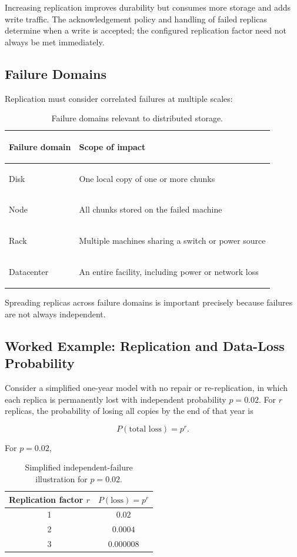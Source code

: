 \documentclass[11pt,a4paper,oneside]{book}
\begin{document}
Increasing replication improves durability but consumes more storage and adds write traffic. The acknowledgement policy and handling of failed replicas determine when a write is accepted; the configured replication factor need not always be met immediately.

\subsection{Failure Domains}

Replication must consider correlated failures at multiple scales:

\begin{table}[htbp]
\centering
\caption{Failure domains relevant to distributed storage.}
\label{tab:failure-domains}
\begin{tabularx}{0.78\textwidth}{>{\bfseries\raggedright\arraybackslash}p{3.1cm} Y}
\toprule
Failure domain & Scope of impact \\
\midrule
Disk & One local copy of one or more chunks \\
Node & All chunks stored on the failed machine \\
Rack & Multiple machines sharing a switch or power source \\
Datacenter & An entire facility, including power or network loss \\
\bottomrule
\end{tabularx}
\end{table}

Spreading replicas across failure domains is important precisely because failures are not always independent.

\subsection{Worked Example: Replication and Data-Loss Probability}

Consider a simplified one-year model with no repair or re-replication, in which each replica is permanently lost with independent probability \(p=0.02\). For \(r\) replicas, the probability of losing all copies by the end of that year is

\begin{equation}
P(\text{total loss}) = p^r.
\label{eq:replica-loss}
\end{equation}

For \(p=0.02\),

\begin{table}[htbp]
\centering
\caption{Simplified independent-failure illustration for \(p=0.02\).}
\label{tab:replica-prob}
\begin{tabular}{cc}
\toprule
Replication factor \(r\) & \(P(\text{loss}) = p^r\) \\
\midrule
1 & \(0.02\) \\
2 & \(0.0004\) \\
3 & \(0.000008\) \\
\bottomrule
\end{tabular}
\end{table}
\end{document}
